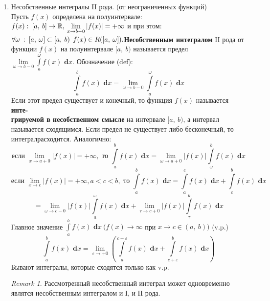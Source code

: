 \documentclass[a4paper,12pt, centered]{bookest}
\theoremstyle{remark}
\newtheorem*{remark}{Remark}
\newcommand\dx{\textbf{ d}x}
\begin{document}
\begin{enumerate}
	\item Нeсобственные интегралы  II рода. (от неограниченных функций)\\ Пусть $f(x)$ определена на полуинтервале: $f(x):\>[a,\>b]\to\mathbb{R},\>\lim\limits_{x\to b-0}\left|f(x)\right|=+\infty\\$ и при этом: $\forall\omega\>:\>[a,\>\omega]\subset[a,\>b)\>\>f(x)\in R([a,\>\omega]).\\$\textbf{Несобственным интегралом }II рода от функции $f(x)$ на полуинтервале $[a,\>b)$ называется предел $\lim\limits_{\omega\to b-0}\int\limits_a^\omega f(x)\dx.$ Обозначение (def): $$\int\limits_a^bf(x)\dx=\lim\limits_{\omega\to b-0}\int\limits_a^\omega f(x)\dx$$ Если этот предел существует и конечный, то функция $f(x)$ называется \textbf{инте-}\\\textbf{грируемой в несобственном смысле }на интервале $[a,\>b)$, а интервал называется сходящимся. Если предел не существует либо бесконечный, то интегралрасходится. Аналогично: $$\textrm{если }\lim\limits_{x\to a+0}\left|f(x)\right|=+\infty,\textrm{ то }\int\limits_a^bf(x)\dx=\lim\limits_{\omega\to a+0}\left|f(x)\right|\int\limits_\omega^bf(x)\dx$$$$\textrm{если }\lim\limits_{x\to c}\left|f(x)\right|=+\infty, a<c<b,\textrm{ то }\int\limits_a^bf(x)\dx=\int\limits_a^cf(x)\dx+\int\limits_c^bf(x)\dx$$ $$=\lim\limits_{\omega\to c-0}\left|f(x)\right|\int\limits^\omega_af(x)\dx+\lim\limits_{\tau\to c+0}\left|f(x)\right|\int\limits_\tau^bf(x)\dx$$ Главное значение $\int\limits_a^bf(x)\dx\>(f(x)\to\infty$ при $x\to c\in(a,\>b))$ (v.p.) $$\int\limits_a^bf(x)\dx=\lim\limits_{\varepsilon\to+0}\left(\int\limits_a^{c-\varepsilon}f(x)\dx+\int\limits_{c+\varepsilon}^bf(x)\dx \right)$$ Бывают интегралы, которые сходятся только как v.p. \begin{remark}
		Рассмотренный несобственный интеграл может одновременно являтся несобственным интегралом и I, и II рода.
	\end{remark}
\end{enumerate}
\end{document}
